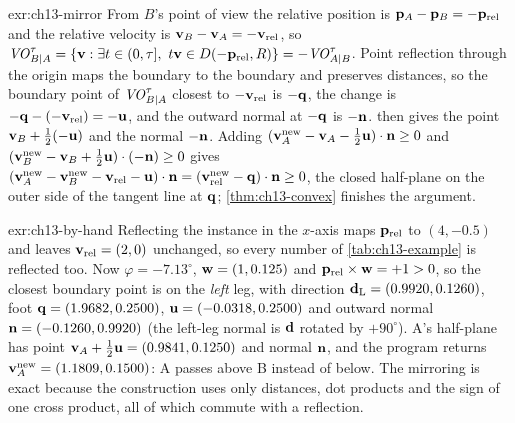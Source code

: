 
\begin{solution}{exr:ch13-mirror}
From $B$'s point of view the relative position is $\mathbf{p}_A - \mathbf{p}_B = -\mathbf{p}_{\mathrm{rel}}$ and the relative velocity is $\mathbf{v}_B - \mathbf{v}_A = -\mathbf{v}_{\mathrm{rel}}$, so $\mathit{VO}^{\tau}_{B|A} = \left\{ \mathbf{v} : \exists t \in (0,\tau],\ t\mathbf{v} \in D(-\mathbf{p}_{\mathrm{rel}},R) \right\} = -\mathit{VO}^{\tau}_{A|B}$. Point reflection through the origin maps the boundary to the boundary and preserves distances, so the boundary point of $\mathit{VO}^{\tau}_{B|A}$ closest to $-\mathbf{v}_{\mathrm{rel}}$ is $-\mathbf{q}$, the change is $-\mathbf{q} - (-\mathbf{v}_{\mathrm{rel}}) = -\mathbf{u}$, and the outward normal at $-\mathbf{q}$ is $-\mathbf{n}$.  then gives the point $\mathbf{v}_B + \tfrac12(-\mathbf{u})$ and the normal $-\mathbf{n}$. Adding $(\mathbf{v}_A^{\mathrm{new}} - \mathbf{v}_A - \tfrac12\mathbf{u})\cdot\mathbf{n} \ge 0$ and $(\mathbf{v}_B^{\mathrm{new}} - \mathbf{v}_B + \tfrac12\mathbf{u})\cdot(-\mathbf{n}) \ge 0$ gives $(\mathbf{v}_A^{\mathrm{new}} - \mathbf{v}_B^{\mathrm{new}} - \mathbf{v}_{\mathrm{rel}} - \mathbf{u})\cdot\mathbf{n} = (\mathbf{v}^{\mathrm{new}}_{\mathrm{rel}} - \mathbf{q})\cdot\mathbf{n} \ge 0$, the closed half-plane on the outer side of the tangent line at $\mathbf{q}$; \cref{thm:ch13-convex} finishes the argument.
\end{solution}

\begin{solution}{exr:ch13-by-hand}
Reflecting the instance in the $x$-axis maps $\mathbf{p}_{\mathrm{rel}}$ to $(4,-0.5)$ and leaves $\mathbf{v}_{\mathrm{rel}} = (2,0)$ unchanged, so every number of \cref{tab:ch13-example} is reflected too. Now $\varphi = -7.13^\circ$, $\mathbf{w} = (1, 0.125)$ and $\mathbf{p}_{\mathrm{rel}} \times \mathbf{w} = +1 > 0$, so the closest boundary point is on the \emph{left} leg, with direction $\mathbf{d}_{\mathrm{L}} = (0.9920, 0.1260)$, foot $\mathbf{q} = (1.9682, 0.2500)$, $\mathbf{u} = (-0.0318, 0.2500)$ and outward normal $\mathbf{n} = (-0.1260, 0.9920)$ (the left-leg normal is $\mathbf{d}$ rotated by $+90^\circ$). A's half-plane has point $\mathbf{v}_A + \tfrac12\mathbf{u} = (0.9841, 0.1250)$ and normal $\mathbf{n}$, and the program returns $\mathbf{v}_A^{\mathrm{new}} = (1.1809, 0.1500)$: A passes above B instead of below. The mirroring is exact because the construction uses only distances, dot products and the sign of one cross product, all of which commute with a reflection.
\end{solution}

